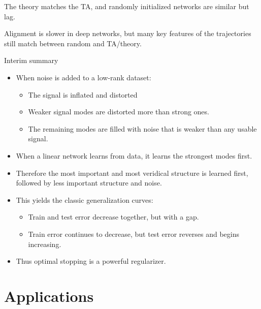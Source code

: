\documentclass{beamer}
\begin{document}
\begin{frame}[standout]
The theory matches the TA, and randomly initialized networks are similar but lag.
\end{frame}


\begin{frame}[standout]
Alignment is slower in deep networks, but many key features of the trajectories still match between random and TA/theory.
\end{frame}


\begin{frame}{Interim summary}
\begin{itemize}[<+->]
\item When noise is added to a low-rank dataset: 
    \begin{itemize}
    \item The signal is inflated and distorted
    \item Weaker signal modes are distorted more than strong ones.
    \item The remaining modes are filled with noise that is weaker than any usable signal.  
    \end{itemize}
\item When a linear network learns from data, it learns the strongest modes first.
\item Therefore the most important and most veridical structure is learned first, followed by less important structure and noise.
\item This yields the classic generalization curves:
    \begin{itemize}
    \item Train and test error decrease together, but with a gap. 
    \item Train error continues to decrease, but test error reverses and begins increasing. 
    \end{itemize}
\item Thus optimal stopping is a powerful regularizer.
\end{itemize}
\end{frame}

\section{Applications}
\end{document}
